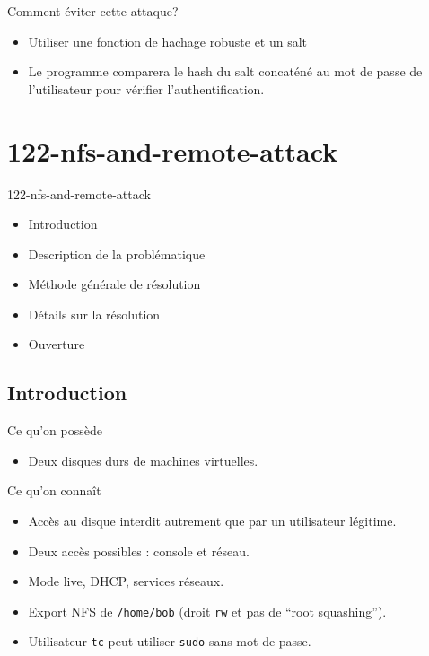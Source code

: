 \documentclass{beamer}
\begin{document}
\begin{frame}
\begin{block}{Comment éviter cette attaque?}
\begin{itemize}
\item Utiliser une fonction de hachage robuste et un salt 
\item Le programme comparera le hash du salt concaténé au mot de passe de l'utilisateur pour vérifier l'authentification. 
\end{itemize}
\end{block}
\end{frame}

	\section{122-nfs-and-remote-attack}
	
	\begin{frame}
	\begin{block}{122-nfs-and-remote-attack}
		\begin{itemize}
			\item Introduction
			\item Description de la problématique
			\item Méthode générale de résolution
			\item Détails sur la résolution
			\item Ouverture
		\end{itemize}
	\end{block}
\end{frame}

\subsection{Introduction}

\begin{frame}[fragile]
\begin{block}{Ce qu'on possède}
\begin{itemize}
	[circle]
	\item Deux disques durs de machines virtuelles.
\end{itemize}
\end{block}
\begin{block}{Ce qu'on connaît}
\begin{itemize}
	[circle]
	\item Accès au disque interdit autrement que par un utilisateur légitime.
	\item Deux accès possibles : console et réseau.
	\item Mode live, DHCP, services réseaux.
	\item Export NFS de \verb+/home/bob+ (droit \verb+rw+ et pas de \enquote{root squashing}).
	\item Utilisateur \verb+tc+ peut utiliser \verb+sudo+ sans mot de passe.
\end{itemize}
\end{block}
\end{frame}
\end{document}
